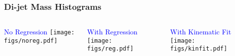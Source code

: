 \documentclass{beamer}
\newcommand{\beginbackup}{
  \newcounter{framenumbervorappendix}
  \setcounter{framenumbervorappendix}{\value{framenumber}}
}
\newcommand{\backupend}{
  \addtocounter{framenumbervorappendix}{-\value{framenumber}}
  \addtocounter{framenumber}{\value{framenumbervorappendix}}
}
\begin{document}
\begin{frame}
  \frametitle{Di-jet Mass Histograms}

  \begin{columns}
    \begin{column}{0.33\linewidth}
      \centering
      \textcolor{blue}{No Regression}
      \texttt{[image: figs/noreg.pdf]}
    \end{column}
    \begin{column}{0.34\linewidth}
      \centering
      \textcolor{blue}{With Regression}
      \texttt{[image: figs/reg.pdf]}
    \end{column}
    \begin{column}{0.33\linewidth}
      \centering
      \textcolor{blue}{With Kinematic Fit}
      \texttt{[image: figs/kinfit.pdf]}
    \end{column}
  \end{columns}

\end{frame}

\begin{comment}
\beginbackup

\begin{frame}
  \centering
    {\Huge \bf\sffamily Backup Slides}
\end{frame}



\backupend
\end{comment}
\end{document}
